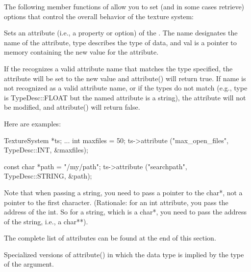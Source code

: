 The following member functions of \TextureSystem allow you to set
(and in some cases retrieve) options that control the overall
behavior of the texture system:


Sets an attribute (i.e., a property or option) of the \TextureSystem.
The {\cf name} designates the name of the attribute, {\cf type}
describes the type of data, and {\cf val} is a pointer to memory 
containing the new value for the attribute.

If the \TextureSystem recognizes a valid attribute name that matches the
type specified, the attribute will be set to the new value and {\cf
  attribute()} will return {\cf true}.  If {\cf name} is not recognized
as a valid attribute name, or if the types do not match (e.g., {\cf
  type} is {\cf TypeDesc::FLOAT} but the named attribute is a string),
the attribute will not be modified, and {\cf attribute()} will return
{\cf false}.

Here are examples:

\begin{code}
      TextureSystem *ts; 
      ...
      int maxfiles = 50;
      ts->attribute ("max_open_files", TypeDesc::INT, &maxfiles);

      const char *path = "/my/path";
      ts->attribute ("searchpath", TypeDesc::STRING, &path);
\end{code}

Note that when passing a string, you need to pass a pointer to the {\cf
  char*}, not a pointer to the first character.  (Rationale: for an {\cf
  int} attribute, you pass the address of the {\cf int}.  So for a
string, which is a {\cf char*}, you need to pass the address of the
string, i.e., a {\cf char**}).

The complete list of attributes can be found at the end of this section.

\apiend

Specialized versions of {\cf attribute()} in which the data type is
implied by the type of the argument.

